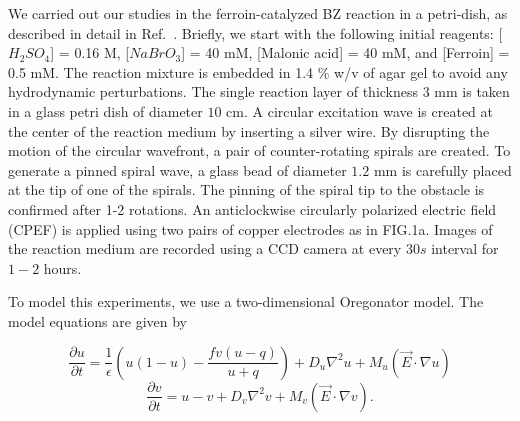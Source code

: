 
We carried out our studies in the ferroin-catalyzed BZ reaction in a petri-dish, as described in detail in Ref.~\cite{Amrutha}. Briefly, we start with the following initial reagents: [$H_2SO_4$] = 0.16 M, [$NaBrO_3$] = 40 mM, [Malonic acid] = 40 mM, and [Ferroin] = 0.5 mM. The reaction mixture is embedded in 1.4 $\%$ w/v of agar gel to avoid any hydrodynamic perturbations. The single reaction layer of thickness $3$ mm is taken in a glass petri dish of diameter $10$ cm. 
A circular excitation wave is created at the center of the reaction medium by inserting a silver wire. By disrupting the motion of the circular wavefront, a pair of counter-rotating spirals are created. To generate a pinned spiral wave, a glass bead of diameter $1.2$ mm is carefully placed at the tip of one of the spirals. The pinning of the spiral tip to the obstacle is confirmed after 1-2 rotations. An anticlockwise circularly polarized electric field (CPEF) is applied using two pairs of copper electrodes as in FIG.1a. Images of the reaction medium are recorded using a CCD camera at every $30 s$ interval for $1-2$ hours.%

To model this experiments, we use a two-dimensional Oregonator model. The model equations are given by 

\begin{equation}\label{E_uoregonator}
\frac{\partial u}{\partial t}=\frac{1}{\epsilon}(u(1-u)-\frac{fv(u-q)}{u+q})
+D_{u}\nabla^2u+M_{u}(\vec{E} \cdot \nabla u)
\end{equation}
\begin{equation}\label{E_voregonator}
\frac{\partial v}{\partial t}=u-v+D_{v}\nabla^2v+M_{v}(\vec{E} \cdot \nabla v).
\end{equation}

